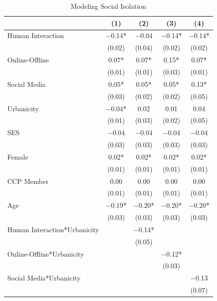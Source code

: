 \documentclass[
  letterpaper,
  DIV=11,
  numbers=noendperiod]{scrartcl}
\begin{document}
\hypertarget{tbl-social-isolation-models}{}
\begin{table}
\caption{\label{tbl-social-isolation-models}Modeling Social Isolation }\tabularnewline

\centering
\begin{threeparttable}
\begin{tabular}[t]{lcccc}
\toprule
  & (1) & (2) & (3) & (4)\\
\midrule
Human Interaction & \num{-0.14}* & \num{-0.04} & \num{-0.14}* & \num{-0.14}*\\
 & (\num{0.02}) & (\num{0.04}) & (\num{0.02}) & (\num{0.02})\\
Online-Offline & \num{0.07}* & \num{0.07}* & \num{0.15}* & \num{0.07}*\\
 & (\num{0.01}) & (\num{0.01}) & (\num{0.03}) & (\num{0.01})\\
Social Media & \num{0.05}* & \num{0.05}* & \num{0.05}* & \num{0.13}*\\
 & (\num{0.03}) & (\num{0.02}) & (\num{0.02}) & (\num{0.05})\\
Urbanicity & \num{-0.04}* & \num{0.02} & \num{0.01} & \num{0.04}\\
 & (\num{0.01}) & (\num{0.03}) & (\num{0.02}) & (\num{0.05})\\
SES & \num{-0.04} & \num{-0.04} & \num{-0.04} & \num{-0.04}\\
 & (\num{0.03}) & (\num{0.03}) & (\num{0.03}) & \vphantom{1} (\num{0.03})\\
Female & \num{0.02}* & \num{0.02}* & \num{0.02}* & \num{0.02}*\\
 & (\num{0.01}) & (\num{0.01}) & (\num{0.01}) & \vphantom{1} (\num{0.01})\\
CCP Member & \num{0.00} & \num{0.00} & \num{0.00} & \num{0.00}\\
 & (\num{0.01}) & (\num{0.01}) & (\num{0.01}) & (\num{0.01})\\
Age & \num{-0.19}* & \num{-0.20}* & \num{-0.20}* & \num{-0.20}*\\
 & (\num{0.03}) & (\num{0.03}) & (\num{0.03}) & (\num{0.03})\\
Human Interaction*Urbanicity &  & \num{-0.14}* &  & \\
 &  & (\num{0.05}) &  & \\
Online-Offline*Urbanicity &  &  & \num{-0.12}* & \\
 &  &  & (\num{0.03}) & \\
Social Media*Urbanicity &  &  &  & \num{-0.13}\\
 &  &  &  & (\num{0.07})\\

\end{tabular}
\end{threeparttable}
\end{table}
\end{document}
